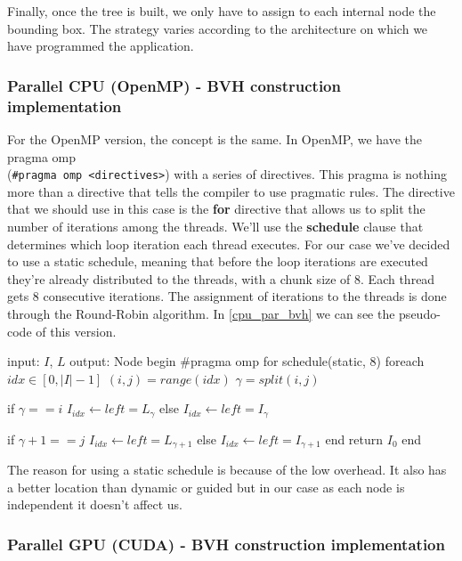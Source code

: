 \documentclass[titlepage,12pt]{report}
\begin{document}
Finally, once the tree is built, we only have to assign to each internal node the bounding box. The strategy varies according to the architecture on which we have programmed the application.

\subsubsection{Parallel CPU (OpenMP) - BVH construction implementation}

For the OpenMP version, the concept is the same. In OpenMP, we have the pragma omp\\
(\lstinline|#pragma omp <directives>|) with a series of directives. This pragma is nothing more than a directive that tells the compiler to use pragmatic rules. The directive that we should use in this case is the \textbf{for} directive that allows us to split the number of iterations among the threads. We'll use the \textbf{schedule} clause that determines which loop iteration each thread executes. For our case we've decided to use a static schedule, meaning that before the loop iterations are executed they're already distributed to the threads, with a chunk size of 8. Each thread gets 8 consecutive iterations. The assignment of iterations to the threads is done through the Round-Robin algorithm. In \ref{cpu_par_bvh} we can see the pseudo-code of this version.

\begin{algorithm}[caption={BVH construction CPU - parallel}, label={cpu_par_bvh}]
input: $I$, $L$
output: Node
begin
  #pragma omp for schedule(static, 8)
  foreach $idx \in [0, |I|-1]$
    $(i,j) = range(idx)$
    $\gamma = split(i,j)$
    
    if $ \gamma == i $
      $I_{idx} \leftarrow left = L_{\gamma}$
    else 
      $I_{idx} \leftarrow left = I_{\gamma}$
    
    if $ \gamma+1 == j $
      $I_{idx} \leftarrow left = L_{\gamma+1}$
    else 
      $I_{idx} \leftarrow left = I_{\gamma+1}$
  end
  return $I_{0}$
end
\end{algorithm}

The reason for using a static schedule is because of the low overhead. It also has a better location than dynamic or guided but in our case as each node is independent it doesn't affect us.

\subsubsection{Parallel GPU (CUDA) - BVH construction implementation}
\end{document}
